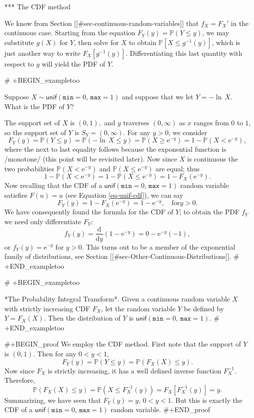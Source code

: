 *** The CDF method

We know from Section [[#sec-continuous-random-variables]] that \(f_{X}=F_{X}'\)
in the continuous case. Starting from the equation
\(F_{Y}(y)=\mathbb{P}(Y\leq y)\), we may substitute \(g(X)\) for
\(Y\), then solve for \(X\) to obtain \(\mathbb{P}[X\leq g^{-1}(y)]\),
which is just another way to write
\(F_{X}[g^{-1}(y)]\). Differentiating this last quantity with respect
to \(y\) will yield the PDF of \(Y\).

# +BEGIN_exampletoo

Suppose \(X\sim\mathsf{unif}(\mathtt{min}=0,\,\mathtt{max}=1)\) and
suppose that we let \(Y=-\ln\, X\). What is the PDF of \(Y\)?

The support set of \(X\) is \((0,1),\) and \(y\) traverses
\((0,\infty)\) as \(x\) ranges from \(0\) to \(1\), so the support set
of \(Y\) is \(S_{Y}=(0,\infty)\). For any \(y>0\), we consider \[
F_{Y}(y)=\mathbb{P}(Y\leq y)=\mathbb{P}(-\ln\, X\leq
y)=\mathbb{P}(X\geq\mathrm{e}^{-y})=1-\mathbb{P}(X<\mathrm{e}^{-y}),
\] where the next to last equality follows because the exponential
function is /monotone/ (this point will be revisited later). Now since
\(X\) is continuous the two probabilities
\(\mathbb{P}(X<\mathrm{e}^{-y})\) and
\(\mathbb{P}(X\leq\mathrm{e}^{-y})\) are equal; thus \[ 1-\mathbb{P}(X
<
\mathrm{e}^{-y})=1-\mathbb{P}(X\leq\mathrm{e}^{-y})=1-F_{X}(\mathrm{e}^{-y}).
\] Now recalling that the CDF of a
\(\mathsf{unif}(\mathtt{min}=0,\,\mathtt{max}=1)\) random variable
satisfies \(F(u)=u\) (see Equation \eqref{eq-unif-cdf}), we can say \[
F_{Y}(y)=1-F_{X}(\mathrm{e}^{-y})=1-\mathrm{e}^{-y},\quad \mbox{for
}y>0.  \] We have consequently found the formula for the CDF of \(Y\);
to obtain the PDF \(f_{Y}\) we need only differentiate \(F_{Y}\): \[
f_{Y}(y)=\frac{\mathrm{d}}{\mathrm{d}
y}\left(1-\mathrm{e}^{-y}\right)=0-\mathrm{e}^{-y}(-1), \] or
\(f_{Y}(y)=\mathrm{e}^{-y}\) for \(y>0\). This turns out to be a
member of the exponential family of distributions, see Section
[[#sec-Other-Continuous-Distributions]].
# +END_exampletoo


# +BEGIN_exampletoo

*The Probability Integral Transform*. Given a continuous random
variable \(X\) with strictly increasing CDF \(F_{X}\), let the random
variable \(Y\) be defined by \(Y=F_{X}(X)\). Then the distribution of
\(Y\) is \(\mathsf{unif}(\mathtt{min}=0,\,\mathtt{max}=1)\).
# +END_exampletoo


#+BEGIN_proof
We employ the CDF method. First note that the support of \(Y\) is
\((0,1)\). Then for any \(0<y<1\), \[ F_{Y}(y)=\mathbb{P}(Y\leq
y)=\mathbb{P}(F_{X}(X)\leq y).  \] Now since \(F_{X}\) is strictly
increasing, it has a well defined inverse function
\(F_{X}^{-1}\). Therefore, \[ \mathbb{P}(F_{X}(X)\leq
y)=\mathbb{P}(X\leq F_{X}^{-1}(y))=F_{X}[F_{X}^{-1}(y)]=y.  \]
Summarizing, we have seen that \(F_{Y}(y)=y\), \(0<y<1\). But this is
exactly the CDF of a
\(\mathsf{unif}(\mathtt{min}=0,\,\mathtt{max}=1)\) random variable.
#+END_proof

